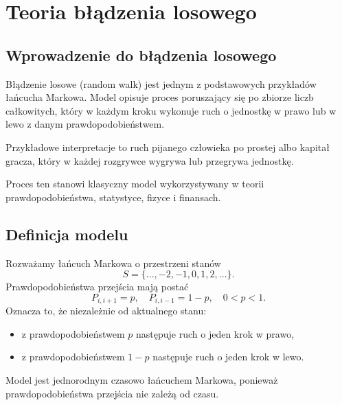 \section{Teoria błądzenia losowego}\label{sec:theory}
\subsection{Wprowadzenie do błądzenia losowego}
Błądzenie losowe (random walk) jest jednym z podstawowych przykładów łańcucha Markowa. Model opisuje proces poruszający się po zbiorze liczb całkowitych, który w każdym kroku wykonuje ruch o jednostkę w prawo lub w lewo z danym prawdopodobieństwem.

Przykładowe interpretacje to ruch pijanego człowieka po prostej albo kapitał gracza, który w każdej rozgrywce wygrywa lub przegrywa jednostkę.

Proces ten stanowi klasyczny model wykorzystywany w teorii prawdopodobieństwa, statystyce, fizyce i finansach.

\subsection{Definicja modelu}
Rozważamy łańcuch Markowa o przestrzeni stanów
$$S= \{...,-2,-1,0,1,2,... \}.$$
Prawdopodobieństwa przejścia mają postać
$$P_{i,i+1}=p, \quad P_{i,i-1}=1-p, \quad 0<p<1.$$
Oznacza to, że niezależnie od aktualnego stanu:
\begin{itemize}
    \item z prawdopodobieństwem $p$ następuje ruch o jeden krok w prawo,
    \item z prawdopodobieństwem $1-p$ następuje ruch o jeden krok w lewo. 
\end{itemize}
Model jest jednorodnym czasowo łańcuchem Markowa, ponieważ prawdopodobieństwa przejścia nie zależą od czasu.

